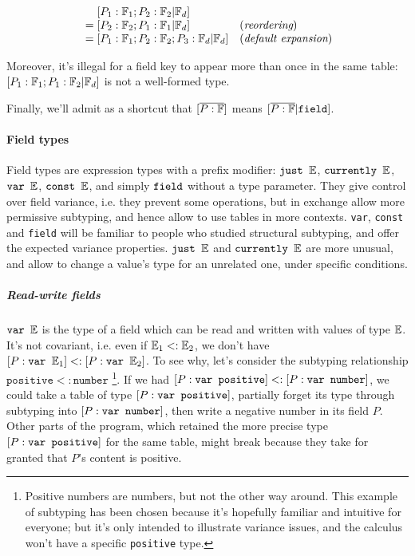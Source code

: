 $$\begin{array}{ll}
 \phantom{{}={}}
    [P_1: \T F_1; P_2:\T F_2|\T F_d]\\
 {}=[P_2: \T F_2; P_1:\T F_1| \T F_d] & \eqlabel{reordering}\\
 {}=[P_1: \T F_1; P_2:\T F_2; P_3:\T F_d| \T F_d]
    & \eqlabel{default expansion} \\
\end{array}$$

Moreover, it's illegal for a field key to appear more than once in the
same table: $[P_1:\mathbb{F}_1; P_1:\mathbb{F}_2 | \mathbb{F}_d]$ is not a well-formed
type.

Finally, we'll admit as a shortcut that $[\overline{P:\mathbb{F}}]$ means
$[\overline{P:\mathbb{F}}|\texttt{field}]$.

\paragraph{Field types}

Field types are expression types with a prefix modifier: $\texttt{just }\mathbb{E}$,
$\texttt{currently }\mathbb{E}$, $\texttt{var }\mathbb{E}$, $\texttt{const }\mathbb{E}$, and simply $\texttt{field}$ without a type
parameter. They give control over field variance, i.e. they prevent
some operations, but in exchange allow more permissive subtyping, and
hence allow to use tables in more contexts. \verb+var+, \verb+const+
and \verb+field+ will be familiar to people who studied structural
subtyping, and offer the expected variance properties. $\texttt{just }\mathbb{E}$ and
$\texttt{currently }\mathbb{E}$ are more unusual, and allow to change a value's type for an
unrelated one, under specific conditions.


\subparagraph{Read-write fields}
$\texttt{var }\mathbb{E}$ is the type of a field which can be read and written with
values of type $\mathbb{E}$. It's not covariant, i.e. even if $\mathbb{E}_1<:\mathbb{E}_2$, we don't have $[P:\texttt{var }\mathbb{E}_1]<: [P:\texttt{var }\mathbb{E}_2]$. To see why, let's
consider the subtyping relationship $\texttt {positive} <: \texttt
{number}$ \footnote{Positive numbers are numbers, but not the other
  way around. This example of subtyping has been chosen because it's
  hopefully familiar and intuitive for everyone; but it's only
  intended to illustrate variance issues, and the calculus won't have
  a specific {\tt positive} type.}. If we had $[P:\texttt{var }\texttt
    {positive}] <: [P:\texttt{var }\texttt {number}]$, we could take a
table of type $[P:\texttt{var }\texttt {positive}]$, partially
forget its type through subtyping into $[P:\texttt{var }\texttt
    {number}]$, then write a negative number in its field
$P$. Other parts of the program, which retained the more precise
type $[ P: \texttt{var }\texttt{positive}]$ for the same
table, might break because they take for granted that $P$'s
content is positive.

